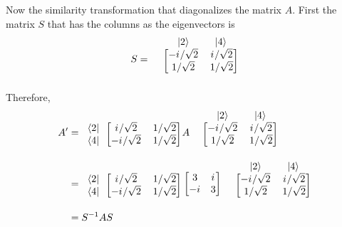 \begin{enumerate}
	Now the similarity transformation that diagonalizes the matrix $A$. First the matrix $S$ that has the columns as the eigenvectors is
	\begin{equation}
		S = 
		\begin{blockarray}{ccc}
		\ & \ket{2} & \ket{4}\\
		\begin{block}{c[cc]}
		\ & -\iu/\sqrt{2} & \iu/\sqrt{2}  \\
		\ & 1/\sqrt{2} & 1/\sqrt{2}	\\
		\end{block}
		\end{blockarray}
	\end{equation}
	Therefore,
	\begin{eqnarray}
	A^\prime &= 
	\begin{blockarray}{ccc}
		\ & \ & \ \\
	\begin{block}{c[cc]}
	\bra{2} & \iu/\sqrt{2} & 1/\sqrt{2}  \\
	\bra{4} & -\iu/\sqrt{2} & 1/\sqrt{2}\\
	\end{block}
	\end{blockarray}
	A
	\begin{blockarray}{ccc}
	\ & \ket{2} & \ket{4}\\
	\begin{block}{c[cc]}
	\ & -\iu/\sqrt{2} & \iu/\sqrt{2}  \\
	\ & 1/\sqrt{2} & 1/\sqrt{2}	\\
	\end{block}
	\end{blockarray} \\
	&= 
	\begin{blockarray}{ccc}
	\ & \ & \ \\
	\begin{block}{c[cc]}
	\bra{2} & \iu/\sqrt{2} & 1/\sqrt{2}  \\
	\bra{4} & -\iu/\sqrt{2} & 1/\sqrt{2}\\
	\end{block}
	\end{blockarray}
	\left[
	\begin{matrix}
	3 & \iu \\ -\iu & 3
	\end{matrix}
	\right]
	\begin{blockarray}{ccc}
	\ & \ket{2} & \ket{4}\\
	\begin{block}{c[cc]}
	\ & -\iu/\sqrt{2} & \iu/\sqrt{2}  \\
	\ & 1/\sqrt{2} & 1/\sqrt{2}	\\
	\end{block}
	\end{blockarray}\\
	&= S^{-1} A S
	\end{eqnarray}
	

\end{enumerate}
